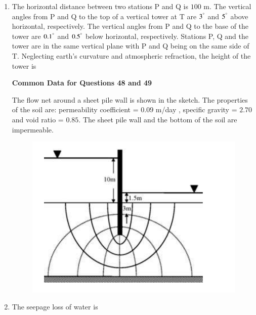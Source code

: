 \documentclass[journal]{IEEEtran}
\begin{document}
\begin{enumerate}
\item The horizontal distance between two stations P and Q is $100$ m. The vertical angles from P and Q to the top of a vertical tower at T are $3^\degree$ and $5^\degree$ above horizontal, respectively. The vertical angles from P and Q to the base of the tower are $0.1^\degree$ and $0.5^\degree$ below horizontal, respectively. Stations P, Q and the tower are in the same vertical plane with P and Q being on the same side of T. Neglecting earth's curvature and atmospheric refraction, the height  of the tower is \hfill {}
\begin{enumerate}
\end{enumerate}


\textbf{Common Data for Questions 48 and 49}

The flow net around a sheet pile wall is shown in the
sketch. The properties of the soil are: permeability
coefficient = $0.09$ m/day , specific gravity
= $2.70$ and void ratio = $0.85$. The sheet pile wall and
the bottom of the soil are impermeable.
\begin{figure}[H]
    \centering
    \includegraphics[width=0.3\columnwidth]{figs/Q48.png} 
    \caption{}
    \label{fig:placeholder}
\end{figure}
\item The seepage loss  of water is \hfill {}
\begin{enumerate}
\end{enumerate}


\end{enumerate}
\end{document}
